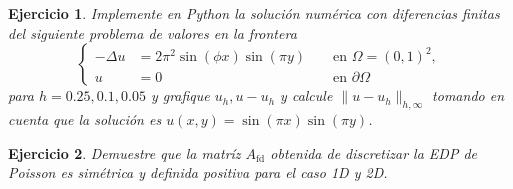 \documentclass[11pt]{article}
\newtheorem{exercise}{Ejercicio}
\newcommand\fd{\mathrm{fd}}
\begin{document}
\begin{exercise}
  Implemente en Python la solución numérica con diferencias finitas
  del siguiente problema de valores en la frontera
  \begin{equation}
    \left\{
      \begin{aligned}
        -\Delta u &= 2\pi^{2}\sin(\phi x)\sin(\pi y)
        && \text{ en } \Omega = (0,1) ^{2},
        \\
        u &= 0 && \text{ en } \partial\Omega
      \end{aligned}
    \right.
  \end{equation}
  para $h=0.25,0.1,0.05$ y grafique $u_h,u-u_h$ y calcule
  $\|u-u_h\|_{h,\infty}$ tomando en cuenta que la solución es
  $u(x,y)=\sin(\pi x)\sin(\pi y)$.
\end{exercise}

\begin{exercise}
  Demuestre que la matríz $A_{\fd}$ obtenida de discretizar la EDP de
  Poisson es simétrica y definida positiva para el caso 1D y 2D.
\end{exercise}
\end{document}
